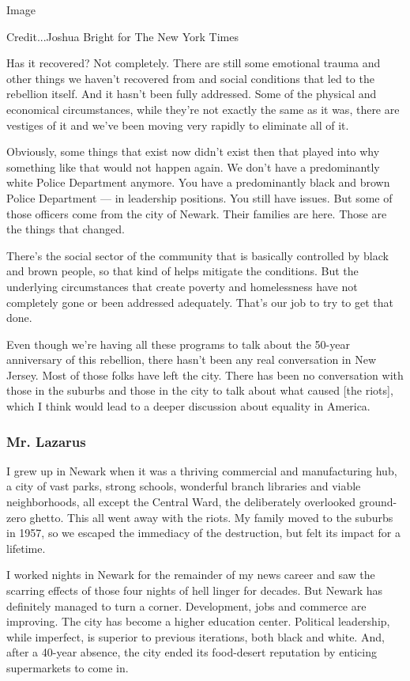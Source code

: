 Image

Credit...Joshua Bright for The New York Times

Has it recovered? Not completely. There are still some emotional trauma
and other things we haven't recovered from and social conditions that
led to the rebellion itself. And it hasn't been fully addressed. Some of
the physical and economical circumstances, while they're not exactly the
same as it was, there are vestiges of it and we've been moving very
rapidly to eliminate all of it.

Obviously, some things that exist now didn't exist then that played into
why something like that would not happen again. We don't have a
predominantly white Police Department anymore. You have a predominantly
black and brown Police Department --- in leadership positions. You still
have issues. But some of those officers come from the city of Newark.
Their families are here. Those are the things that changed.

There's the social sector of the community that is basically controlled
by black and brown people, so that kind of helps mitigate the
conditions. But the underlying circumstances that create poverty and
homelessness have not completely gone or been addressed adequately.
That's our job to try to get that done.

Even though we're having all these programs to talk about the 50-year
anniversary of this rebellion, there hasn't been any real conversation
in New Jersey. Most of those folks have left the city. There has been no
conversation with those in the suburbs and those in the city to talk
about what caused {[}the riots{]}, which I think would lead to a deeper
discussion about equality in America.

\hypertarget{mr-lazarus}{%
\subsubsection{Mr. Lazarus}\label{mr-lazarus}}

I grew up in Newark when it was a thriving commercial and manufacturing
hub, a city of vast parks, strong schools, wonderful branch libraries
and viable neighborhoods, all except the Central Ward, the deliberately
overlooked ground-zero ghetto. This all went away with the riots. My
family moved to the suburbs in 1957, so we escaped the immediacy of the
destruction, but felt its impact for a lifetime.

I worked nights in Newark for the remainder of my news career and saw
the scarring effects of those four nights of hell linger for decades.
But Newark has definitely managed to turn a corner. Development, jobs
and commerce are improving. The city has become a higher education
center. Political leadership, while imperfect, is superior to previous
iterations, both black and white. And, after a 40-year absence, the city
ended its food-desert reputation by enticing supermarkets to come in. ~

